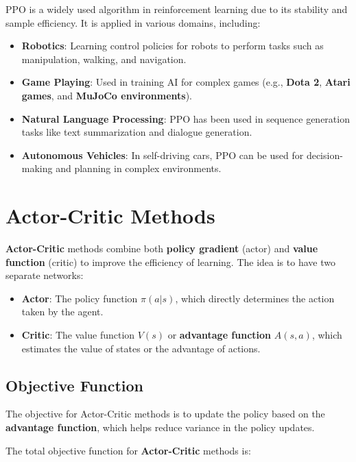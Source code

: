 \documentclass[
]{book}
\providecommand{\tightlist}{%
  \setlength{\itemsep}{0pt}\setlength{\parskip}{0pt}}
\begin{document}
PPO is a widely used algorithm in reinforcement learning due to its stability and sample efficiency. It is applied in various domains, including:

\begin{itemize}
\tightlist
\item
  \textbf{Robotics}: Learning control policies for robots to perform tasks such as manipulation, walking, and navigation.
\item
  \textbf{Game Playing}: Used in training AI for complex games (e.g., \textbf{Dota 2}, \textbf{Atari games}, and \textbf{MuJoCo environments}).
\item
  \textbf{Natural Language Processing}: PPO has been used in sequence generation tasks like text summarization and dialogue generation.
\item
  \textbf{Autonomous Vehicles}: In self-driving cars, PPO can be used for decision-making and planning in complex environments.
\end{itemize}

\section{Actor-Critic Methods}\label{actor-critic-methods-1}

\textbf{Actor-Critic} methods combine both \textbf{policy gradient} (actor) and \textbf{value function} (critic) to improve the efficiency of learning. The idea is to have two separate networks:

\begin{itemize}
\tightlist
\item
  \textbf{Actor}: The policy function \(\pi(a|s)\), which directly determines the action taken by the agent.
\item
  \textbf{Critic}: The value function \(V(s)\) or \textbf{advantage function} \(A(s, a)\), which estimates the value of states or the advantage of actions.
\end{itemize}

\subsection{Objective Function}\label{objective-function}

The objective for Actor-Critic methods is to update the policy based on the \textbf{advantage function}, which helps reduce variance in the policy updates.

The total objective function for \textbf{Actor-Critic} methods is:
\end{document}
